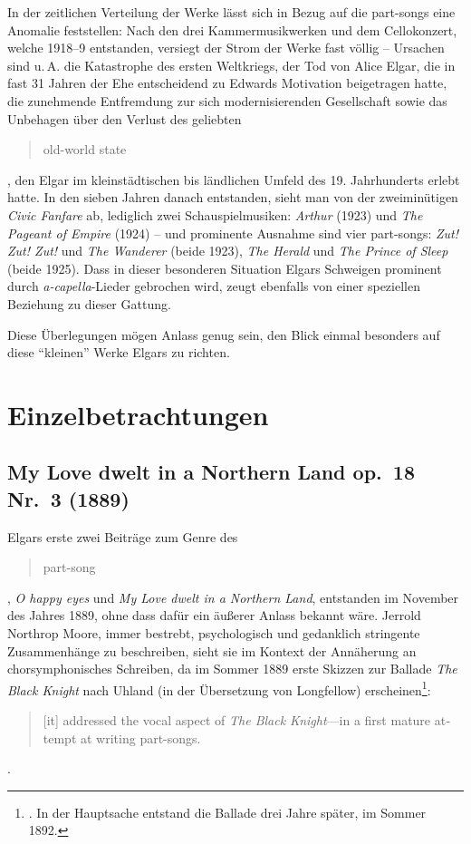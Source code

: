 \documentclass[a4paper,11pt,open=any]{scrbook}
\newcommand{\engquote}[1]{\foreignblockquote{english}{#1}}
\begin{document}
In der zeitlichen Verteilung der Werke lässt sich in Bezug auf die
part-songs eine Anomalie feststellen: Nach den drei Kammermusikwerken
und dem Cellokonzert, welche 1918–9 entstanden, versiegt der Strom der
Werke fast völlig – Ursachen sind u.\,A. die Katastrophe des ersten
Weltkriegs, der Tod von Alice Elgar, die in fast 31 Jahren der Ehe
entscheidend zu Edwards Motivation beigetragen hatte, die zunehmende
Entfremdung zur sich modernisierenden Gesellschaft sowie das Unbehagen
über den Verlust des geliebten \engquote{old-world state}, den Elgar im
kleinstädtischen bis ländlichen Umfeld des 19. Jahrhunderts erlebt hatte.
In den sieben Jahren danach entstanden, sieht man von der zweiminütigen
\textit{Civic Fanfare} ab, lediglich zwei Schauspielmusiken: \textit{Arthur}
(1923) und \textit{The Pageant of Empire} (1924) – und prominente Ausnahme
sind vier part-songs: \textit{Zut! Zut! Zut!} und \textit{The Wanderer}
(beide 1923), \textit{The Herald} und \textit{The Prince of Sleep} (beide
1925).  Dass in dieser besonderen Situation Elgars Schweigen prominent
durch \textit{a-capella}-Lieder gebrochen wird, zeugt ebenfalls von
einer speziellen Beziehung zu dieser Gattung.

Diese Überlegungen mögen Anlass genug sein, den Blick einmal besonders
auf diese \enquote{kleinen} Werke Elgars zu richten.


\chapter{Einzelbetrachtungen}

\section{My Love dwelt in a Northern Land \textmd{op.~18 Nr.~3 (1889)}}

Elgars erste zwei Beiträge zum Genre des \engquote{part-song}, \textit{O
happy eyes} und \textit{My Love dwelt in a Northern Land}, entstanden im
November des Jahres 1889, ohne dass dafür ein äußerer Anlass bekannt wäre.
Jerrold Northrop Moore, immer bestrebt, psychologisch und gedanklich
stringente Zusammenhänge zu beschreiben, sieht sie im Kontext der Annäherung
an chorsymphonisches Schreiben, da im Sommer 1889 erste Skizzen zur Ballade
\textit{The Black Knight} nach Uhland (in der Übersetzung von Longfellow)
erscheinen\footnote{\cite[S.~136]{moore}.  In der Hauptsache entstand die
Ballade drei Jahre später, im Sommer 1892.}: \engquote{[it] addressed the
vocal aspect of \textit{The Black Knight}—in a first mature attempt at
writing part-songs.}\cite[S.~141]{moore}.
\end{document}
